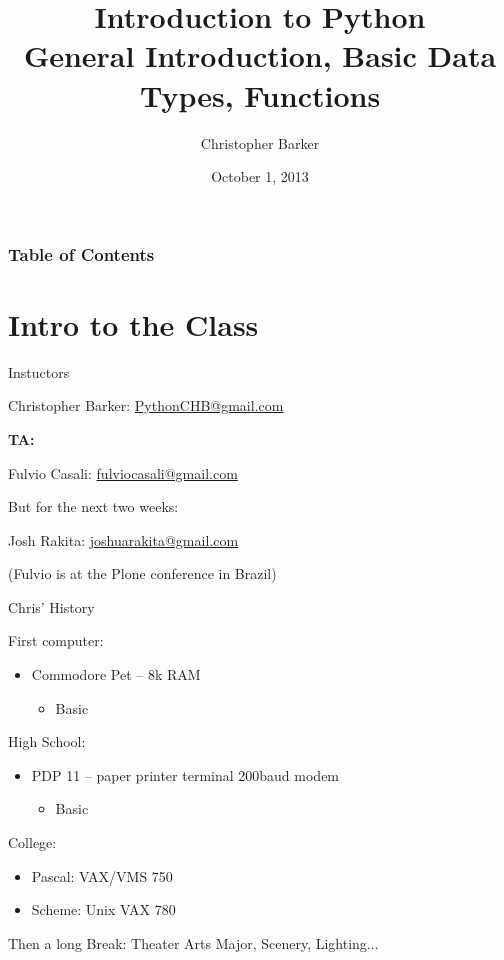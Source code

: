 \documentclass{beamer}
\title[Intro to Python: Week 1]{Introduction  to Python\\ General Introduction, Basic Data Types, Functions}
\author{Christopher Barker}
\institute{UW Continuing Education}
\date{October 1, 2013}
\begin{document}
\begin{frame}
\titlepage
\end{frame}

\begin{frame}
\frametitle{Table of Contents}
\tableofcontents
\end{frame}

\section{Intro to the Class}

\begin{frame}{Instuctors}

{\large
Christopher Barker: \url{PythonCHB@gmail.com}


\vfill
{\bf TA:}

Fulvio Casali: \url{fulviocasali@gmail.com}

\vfill
But for the next two weeks:

\vfill
Josh Rakita: \url{joshuarakita@gmail.com}

\vfill
(Fulvio is at the Plone conference in Brazil)

\vfill

}
\end{frame}


\begin{frame}{Chris' History}

{\Large First computer:}
\begin{itemize}
  \item Commodore Pet -- 8k RAM
  \begin{itemize}
    \item  Basic
  \end{itemize}
\end{itemize}


{\Large High School:}
\begin{itemize}
  \item PDP 11 -- paper printer terminal 200baud modem 
  \begin{itemize}
    \item  Basic
  \end{itemize}
\end{itemize}


{\Large College: }
\begin{itemize}
  \item Pascal:  VAX/VMS  750 
  \item Scheme:  Unix VAX 780
\end{itemize}

\vspace{0.25in}


Then a long Break: Theater Arts Major, Scenery, Lighting...

\end{frame}
\end{document}
